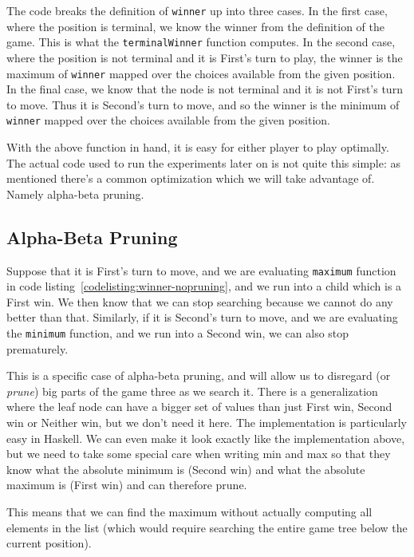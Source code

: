 The code breaks the definition of \texttt{winner} up into three cases.
In the first case, where the position is terminal, we know the winner from the definition of the game. This is what the \texttt{terminalWinner} function computes.
In the second case, where the position is not terminal and it is First's turn to play, the winner is the maximum of \texttt{winner} mapped over the choices available from the given position.
In the final case, we know that the node is not terminal and it is not First's turn to move. Thus it is Second's turn to move, and so the winner is the minimum of \texttt{winner} mapped over the choices available from the given position.

With the above function in hand, it is easy for either player to play optimally.
The actual code used to run the experiments later on is not quite this simple: as mentioned there's a common optimization which we will take advantage of.
Namely alpha-beta pruning.

\subsection {Alpha-Beta Pruning}
\label{sec:alpha_beta}

Suppose that it is First's turn to move, and we are evaluating \texttt{maximum} function in code listing~\ref{codelisting:winner-nopruning}, and we run into a child which is a First win.
We then know that we can stop searching because we cannot do any better than that.
Similarly, if it is Second's turn to move, and we are evaluating the \texttt{minimum} function, and we run into a Second win, we can also stop prematurely.

This is a specific case of alpha-beta pruning, and will allow us to disregard (or \emph{prune}) big parts of the game three as we search it.
There is a generalization where the leaf node can have a bigger set of values than just First win, Second win or Neither win, but we don't need it here.
The implementation is particularly easy in Haskell. We can even make it look exactly like the implementation above, but we need to take some special care when writing min and max so that they know what the absolute minimum is (Second win) and what the absolute maximum is (First win) and can therefore prune.

This means that we can find the maximum without actually computing all elements in the list (which would require searching the entire game tree below the current position).


